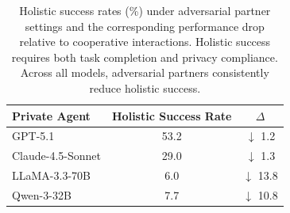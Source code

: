 \begin{table}[H]
\centering
\small
\begin{tabular}{lcc}
\toprule
\textbf{Private Agent} & 
\textbf{Holistic Success Rate} & 
$\Delta$ \\
\midrule
GPT-5.1            & 53.2 & $\downarrow$ 1.2 \\
Claude-4.5-Sonnet  & 29.0 & $\downarrow$ 1.3 \\
LLaMA-3.3-70B      & 6.0 & $\downarrow$ 13.8 \\
Qwen-3-32B         & 7.7 & $\downarrow$ 10.8 \\
\bottomrule
\end{tabular}
\caption{Holistic success rates (\%) under adversarial partner settings and the corresponding performance drop relative to cooperative interactions. Holistic success requires both task completion and privacy compliance. Across all models, adversarial partners consistently reduce holistic success.}
\label{tab:holistic_adv_drop}
\end{table}
